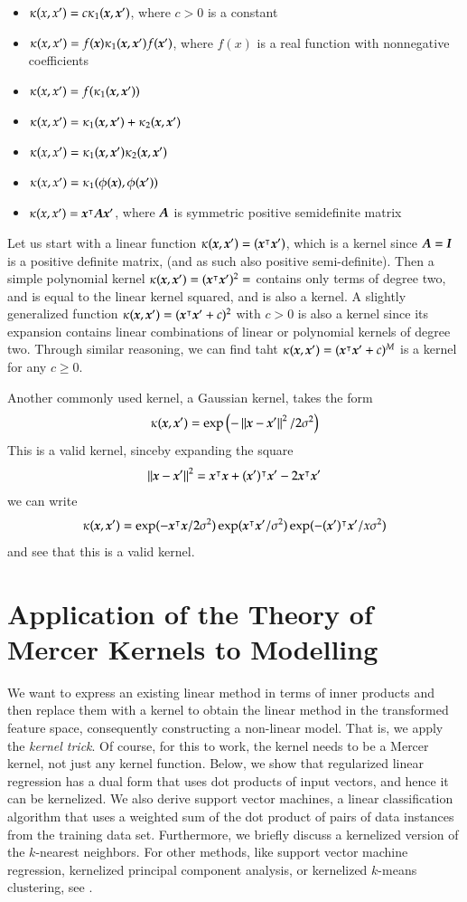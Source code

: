 \begin{refsection}
\begin{itemize}
    \item $\kappa(x, x') = c\kappa_1(\boldsymbol{x},\boldsymbol{x}')$, where $c>0$ is a constant
    \item $\kappa(x, x') = f(\boldsymbol{x})\kappa_1(\boldsymbol{x}, \boldsymbol{x}')f(\boldsymbol{x}')$, where $f(x)$ is a real function with nonnegative coefficients
    \item $\kappa(x, x') = f(\kappa_1(\boldsymbol{x}, \boldsymbol{x}'))$
    \item $\kappa(x, x') = \kappa_1(\boldsymbol{x}, \boldsymbol{x}') + \kappa_2(\boldsymbol{x},\boldsymbol{x}')$
    \item $\kappa(x, x') = \kappa_1(\boldsymbol{x}, \boldsymbol{x}')\kappa_2(\boldsymbol{x},\boldsymbol{x}')$
    \item $\kappa(x, x') = \kappa_1(\phi(\boldsymbol{x}),\phi(\boldsymbol{x}'))$
    \item $\kappa(x, x') = \boldsymbol{x}^\intercal \boldsymbol{A}\boldsymbol{x}'$, where $\boldsymbol{A}$ is symmetric positive semidefinite matrix
\end{itemize}

Let us start with a linear function $\kappa(\boldsymbol{x},\boldsymbol{x}')=(\boldsymbol{x}^\intercal \boldsymbol{x}')$, which is a kernel since $\boldsymbol{A}=\boldsymbol{I}$ is a positive definite matrix, (and as such also positive semi-definite). Then a simple polynomial kernel $\kappa(\boldsymbol{x},\boldsymbol{x}')=(\boldsymbol{x}^\intercal \boldsymbol{x}')^2=$ contains only terms of degree two, and is equal to the linear kernel squared, and is also a kernel. A slightly generalized function $\kappa(\boldsymbol{x},\boldsymbol{x}')=(\boldsymbol{x}^\intercal \boldsymbol{x}'+c)^2$ with $c>0$ is also a kernel since its expansion contains linear combinations of linear or polynomial kernels of degree two. Through similar reasoning, we can find taht $\kappa(\boldsymbol{x},\boldsymbol{x}')=(\boldsymbol{x}^\intercal \boldsymbol{x}'+c)^M$ is a kernel for any $c\geq 0$.

Another commonly used kernel, a Gaussian kernel, takes the form
$$ \kappa(\boldsymbol{x}, \boldsymbol{x}')=\exp\left(-\left\lVert\boldsymbol{x}-\boldsymbol{x}'\right\rVert^2/2\sigma^2 \right) $$
This is a valid kernel, sinceby expanding the square
$$ \left\lVert\boldsymbol{x}-\boldsymbol{x}'\right\rVert^2=\boldsymbol{x}^\intercal\boldsymbol{x} + (\boldsymbol{x}')^\intercal\boldsymbol{x}' - 2\boldsymbol{x}^\intercal \boldsymbol{x}' $$
we can write
$$ \kappa(\boldsymbol{x}, \boldsymbol{x}')=\exp(-\boldsymbol{x}^\intercal\boldsymbol{x}/2\sigma^2) \exp(\boldsymbol{x}^\intercal\boldsymbol{x}'/\sigma^2) \exp(-(\boldsymbol{x}')^\intercal\boldsymbol{x}'/ x\sigma^2) $$
and see that this is a valid kernel.

\section{Application of the Theory of Mercer Kernels to Modelling}

We want to express an existing linear method in terms of inner products and then replace them with a kernel to obtain the linear method in the transformed feature space, consequently constructing a non-linear model. That is, we apply the \emph{kernel trick}. Of course, for this to work, the kernel needs to be a Mercer kernel, not just any kernel function. Below, we show that regularized linear regression has a dual form that uses dot products of input vectors, and hence it can be kernelized. We also derive support vector machines, a linear classification algorithm that uses a weighted sum of the dot product of pairs of data instances from the training data set. Furthermore, we briefly discuss a kernelized version of the $k$-nearest neighbors. For other methods, like support vector machine regression, kernelized principal component analysis, or kernelized $k$-means clustering, see \citep{2012-Murphy}.


\end{refsection}
